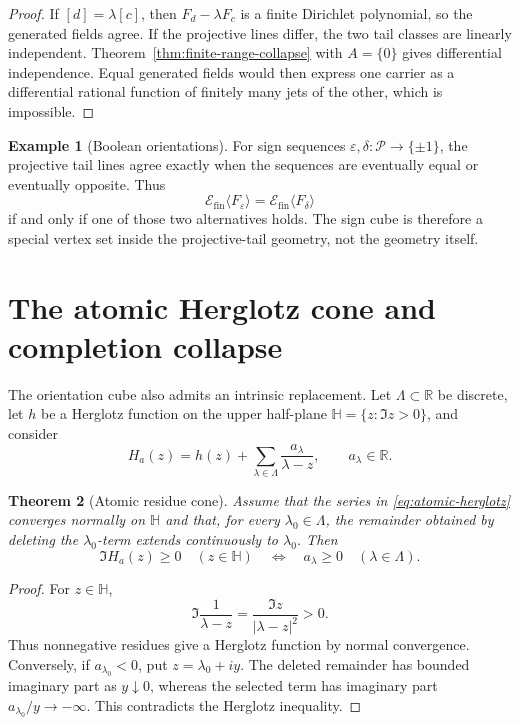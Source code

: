 \documentclass[11pt]{article}
\newtheorem{theorem}{Theorem}[section]
\theoremstyle{definition}
\newtheorem{example}[theorem]{Example}
\theoremstyle{remark}
\newcommand{\R}{\mathbb R}
\newcommand{\cP}{\mathcal P}
\begin{document}
\begin{proof}
If \([d]=\lambda[c]\), then \(F_d-\lambda F_c\) is a finite Dirichlet polynomial, so
the generated fields agree.  If the projective lines differ, the two tail classes are linearly
independent.  Theorem~\ref{thm:finite-range-collapse} with \(A=\{0\}\) gives differential
independence.  Equal generated fields would then express one carrier as a differential rational
function of finitely many jets of the other, which is impossible.
\end{proof}

\begin{example}[Boolean orientations]
For sign sequences \(\varepsilon,\delta:\cP\to\{\pm1\}\), the projective tail lines
agree exactly when the sequences are eventually equal or eventually opposite.  Thus
\[
  \mathscr E_{\mathrm{fin}}\langle F_\varepsilon\rangle
  =
  \mathscr E_{\mathrm{fin}}\langle F_\delta\rangle
\]
if and only if one of those two alternatives holds.  The sign cube is therefore a special
vertex set inside the projective-tail geometry, not the geometry itself.
\end{example}

\section{The atomic Herglotz cone and completion collapse}
\label{sec:herglotz}

The orientation cube also admits an intrinsic replacement.  Let \(\Lambda\subset\R\) be
discrete, let \(h\) be a Herglotz function on the upper half-plane
\(\mathbb H=\{z:\Im z>0\}\), and consider
\begin{equation}\label{eq:atomic-herglotz}
  H_a(z)=h(z)+\sum_{\lambda\in\Lambda}\frac{a_\lambda}{\lambda-z},
  \qquad a_\lambda\in\R.
\end{equation}

\begin{theorem}[Atomic residue cone]\label{thm:residue-cone}
Assume that the series in \eqref{eq:atomic-herglotz} converges normally on \(\mathbb H\)
and that, for every \(\lambda_0\in\Lambda\), the remainder obtained by deleting the
\(\lambda_0\)-term extends continuously to \(\lambda_0\).  Then
\[
  \Im H_a(z)\geq0\quad(z\in\mathbb H)
  \quad\Longleftrightarrow\quad
  a_\lambda\geq0\quad(\lambda\in\Lambda).
\]
\end{theorem}

\begin{proof}
For \(z\in\mathbb H\),
\[
  \Im\frac1{\lambda-z}
  =\frac{\Im z}{|\lambda-z|^2}>0.
\]
Thus nonnegative residues give a Herglotz function by normal convergence.  Conversely, if
\(a_{\lambda_0}<0\), put \(z=\lambda_0+iy\).  The deleted remainder has bounded imaginary
part as \(y\downarrow0\), whereas the selected term has imaginary part
\(a_{\lambda_0}/y\to-\infty\).  This contradicts the Herglotz inequality.
\end{proof}
\end{document}
